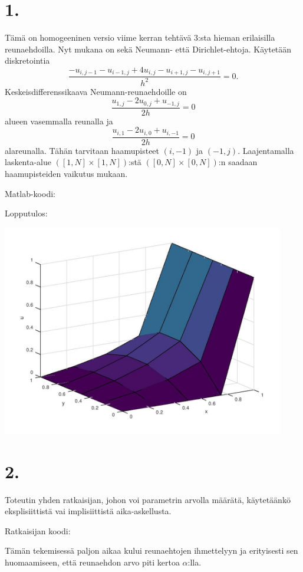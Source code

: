 \documentclass{article}
\title{}
\author{Mikael Myyrä}
\date{}
\begin{document}
\section*{1.}

Tämä on homogeeninen versio viime kerran tehtävä 3:sta hieman erilaisilla
reunaehdoilla. Nyt mukana on sekä Neumann- että Dirichlet-ehtoja.
Käytetään diskretointia
\[
  \frac{-u_{i,j-1} - u_{i-1,j} + 4u_{i,j} - u_{i+1,j} - u_{i,j+1}}{h^2} = 0.
\]
Keskeisdifferenssikaava Neumann-reunaehdoille on
\[
  \frac{u_{1,j} - 2u_{0,j} + u_{-1,j}}{2h} = 0
\]
alueen vasemmalla reunalla ja
\[
  \frac{u_{i,1} - 2u_{i,0} + u_{i,-1}}{2h} = 0
\]
alareunalla. Tähän tarvitaan haamupisteet $(i,-1)$ ja $(-1,j)$.
Laajentamalla laskenta-alue $([1, N] \times [1, N])$:stä
$([0, N] \times [0, N])$:n saadaan haamupisteiden vaikutus mukaan.

Matlab-koodi:



Lopputulos:

\includegraphics[width=350pt]{w4_1.jpg}

\newpage

\section*{2.}

Toteutin yhden ratkaisijan, johon voi parametrin arvolla määrätä,
käytetäänkö eksplisiittistä vai implisiittistä aika-askellusta.

Ratkaisijan koodi:



Tämän tekemisessä paljon aikaa kului reunaehtojen ihmettelyyn ja erityisesti sen
huomaamiseen, että reunaehdon arvo piti kertoa $\alpha$:lla.
\end{document}
